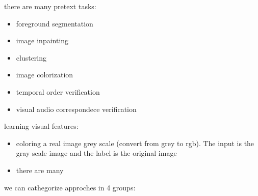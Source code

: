 there are many pretext tasks:
\begin{itemize}
    \item foreground segmentation
    \item image inpainting 
    \item clustering 
    \item image colorization
    \item temporal order verification
    \item visual audio correspondece verification
\end{itemize}

learning visual features:
\begin{itemize}
    \item coloring a real image grey scale (convert from grey to rgb). The 
    input is the gray scale image and the label is the original image
    \item there are many
\end{itemize}
we can cathegorize approches in 4 groups:
